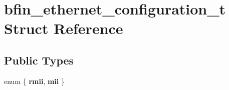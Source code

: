 \hypertarget{structbfin__ethernet__configuration__t}{}\section{bfin\+\_\+ethernet\+\_\+configuration\+\_\+t Struct Reference}
\label{structbfin__ethernet__configuration__t}
\subsection*{Public Types}
\begin{DoxyCompactItemize}
\item 
\mbox{\label{structbfin__ethernet__configuration__t_a3b140f7aff16e64e7e974b34b1c98a8d}} 
enum \{ {\bfseries rmii}, 
{\bfseries mii}
 \}
\end{DoxyCompactItemize}
